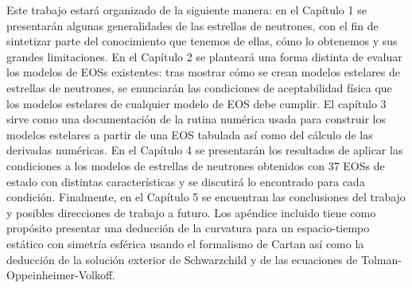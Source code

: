Este trabajo estará organizado de la siguiente manera: en el Capítulo 1 se presentarán algunas generalidades de las estrellas de neutrones, con el fin de sintetizar parte del conocimiento que tenemos de ellas, cómo lo obtenemos y sus grandes limitaciones. En el Capítulo 2 se planteará una forma distinta de evaluar los modelos de EOSs existentes: tras mostrar cómo se crean modelos estelares de estrellas de neutrones, se enunciarán las condiciones de aceptabilidad física que los modelos estelares de cualquier modelo de EOS debe cumplir. El capítulo 3 sirve como una documentación de la rutina numérica usada para construir los modelos estelares a partir de una EOS tabulada así como del cálculo de las derivadas numéricas. En el Capítulo 4 se presentarán los resultados de aplicar las condiciones a los modelos de estrellas de neutrones obtenidos con 37 EOSs de estado con distintas características y se discutirá lo encontrado para cada condición. Finalmente, en el Capítulo 5 se encuentran las conclusiones del trabajo y posibles direcciones de trabajo a futuro. Los apéndice incluido tiene como propósito presentar una deducción de la curvatura para un espacio-tiempo estático con simetría esférica usando el formalismo de Cartan así como la deducción de la solución exterior de Schwarzchild y de las ecuaciones de Tolman-Oppeinheimer-Volkoff. 

